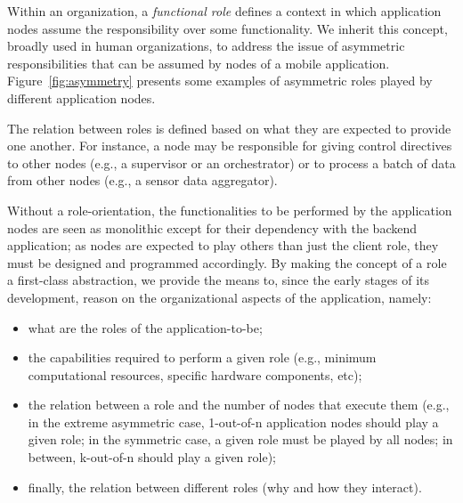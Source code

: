 

Within an organization, a \textit{functional role} defines a context in which application nodes assume the responsibility over some functionality. 
We inherit this concept, broadly used in human organizations, to address the 
issue of asymmetric responsibilities that can be assumed by nodes of a mobile application. Figure~\ref{fig:asymmetry} presents some examples of asymmetric roles played by different application nodes. 

The relation between roles is defined based on what they are expected to provide one another. For instance, a node may be responsible for giving control directives to other nodes (e.g., a supervisor or an orchestrator) or to process a batch of data from other nodes (e.g., a sensor data aggregator). 

Without a role-orientation, the functionalities to be performed by the application nodes are seen as monolithic except for their dependency with the backend application; as nodes are expected to play others than just the client role, they must be designed and programmed accordingly. By making the concept of a role a first-class abstraction, we provide the means to, since the early stages of its development, reason on the organizational aspects of the application, namely:



\begin{itemize}
	
	\item what are the roles of the application-to-be;
	
	\item the capabilities required to perform a given role (e.g., minimum computational resources, specific hardware components, etc); 
	
	\item the relation between a role and the number of nodes that execute them (e.g., in the extreme asymmetric case, 1-out-of-n application nodes should play a given role; in the symmetric case, a given role must be played by all nodes; in between, k-out-of-n should play a given role);   
	
	\item finally, the relation between different roles (why and how they interact).
	
\end{itemize}

